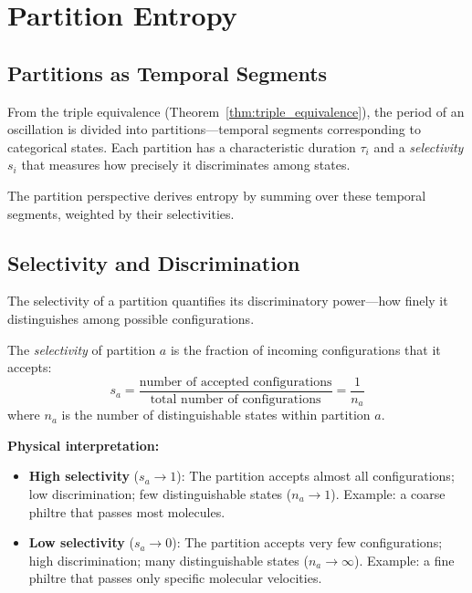 \section{Partition Entropy}
\label{sec:partition}

\subsection{Partitions as Temporal Segments}

From the triple equivalence (Theorem~\ref{thm:triple_equivalence}), the period of an oscillation is divided into partitions---temporal segments corresponding to categorical states. Each partition has a characteristic duration $\tau_i$ and a \textit{selectivity} $s_i$ that measures how precisely it discriminates among states.

The partition perspective derives entropy by summing over these temporal segments, weighted by their selectivities.

\subsection{Selectivity and Discrimination}

The selectivity of a partition quantifies its discriminatory power—how finely it distinguishes among possible configurations.

\begin{definition}
The \textit{selectivity} of partition $a$ is the fraction of incoming configurations that it accepts:
\begin{equation}
s_a = \frac{\text{number of accepted configurations}}{\text{total number of configurations}} = \frac{1}{n_a}
\end{equation}
where $n_a$ is the number of distinguishable states within partition $a$.
\end{definition}

\textbf{Physical interpretation:}
\begin{itemize}
\item \textbf{High selectivity} ($s_a \to 1$): The partition accepts almost all configurations; low discrimination; few distinguishable states ($n_a \to 1$). Example: a coarse philtre that passes most molecules.
\item \textbf{Low selectivity} ($s_a \to 0$): The partition accepts very few configurations; high discrimination; many distinguishable states ($n_a \to \infty$). Example: a fine philtre that passes only specific molecular velocities.
\end{itemize}

